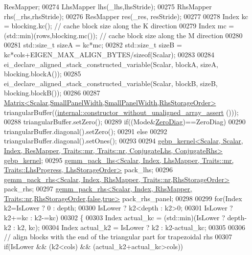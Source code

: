 \begin{DoxyCode}
       ResMapper;
00274     LhsMapper lhs(\_lhs,lhsStride);
00275     RhsMapper rhs(\_rhs,rhsStride);
00276     ResMapper res(\_res, resStride);
00277 
00278     Index kc = blocking.kc();                   \textcolor{comment}{// cache block size along the K direction}
00279     Index mc = (std::min)(rows,blocking.mc());  \textcolor{comment}{// cache block size along the M direction}
00280 
00281     std::size\_t sizeA = kc*mc;
00282     std::size\_t sizeB = kc*cols+EIGEN\_MAX\_ALIGN\_BYTES/\textcolor{keyword}{sizeof}(Scalar);
00283 
00284     ei\_declare\_aligned\_stack\_constructed\_variable(Scalar, blockA, sizeA, blocking.blockA());
00285     ei\_declare\_aligned\_stack\_constructed\_variable(Scalar, blockB, sizeB, blocking.blockB());
00286 
00287     \hyperlink{group___core___module_class_eigen_1_1_matrix}{Matrix<Scalar,SmallPanelWidth,SmallPanelWidth,RhsStorageOrder>}
       triangularBuffer((\hyperlink{struct_eigen_1_1internal_1_1constructor__without__unaligned__array__assert}{internal::constructor\_without\_unaligned\_array\_assert}
      ()));
00288     triangularBuffer.setZero();
00289     \textcolor{keywordflow}{if}((Mode&\hyperlink{group__enums_gga39e3366ff5554d731e7dc8bb642f83cda884ff7240392e85aa6e4b3c957e36483}{ZeroDiag})==ZeroDiag)
00290       triangularBuffer.diagonal().setZero();
00291     \textcolor{keywordflow}{else}
00292       triangularBuffer.diagonal().setOnes();
00293 
00294     
      \hyperlink{struct_eigen_1_1internal_1_1gebp__kernel}{gebp\_kernel<Scalar, Scalar, Index, ResMapper, Traits::mr, Traits::nr, ConjugateLhs, ConjugateRhs>}
       \hyperlink{struct_eigen_1_1internal_1_1gebp__kernel}{gebp\_kernel};
00295     
      \hyperlink{struct_eigen_1_1internal_1_1gemm__pack__lhs}{gemm\_pack\_lhs<Scalar, Index, LhsMapper, Traits::mr, Traits::LhsProgress, LhsStorageOrder>}
       pack\_lhs;
00296     \hyperlink{struct_eigen_1_1internal_1_1gemm__pack__rhs}{gemm\_pack\_rhs<Scalar, Index, RhsMapper, Traits::nr,RhsStorageOrder>}
       pack\_rhs;
00297     
      \hyperlink{struct_eigen_1_1internal_1_1gemm__pack__rhs}{gemm\_pack\_rhs<Scalar, Index, RhsMapper, Traits::nr,RhsStorageOrder,false,true>}
       pack\_rhs\_panel;
00298 
00299     \textcolor{keywordflow}{for}(Index k2=IsLower ? 0 : depth;
00300         IsLower ? k2<depth  : k2>0;
00301         IsLower ? k2+=kc   : k2-=kc)
00302     \{
00303       Index actual\_kc = (std::min)(IsLower ? depth-k2 : k2, kc);
00304       Index actual\_k2 = IsLower ? k2 : k2-actual\_kc;
00305 
00306       \textcolor{comment}{// align blocks with the end of the triangular part for trapezoidal rhs}
00307       \textcolor{keywordflow}{if}(IsLower && (k2<cols) && (actual\_k2+actual\_kc>cols))

\end{DoxyCode}
